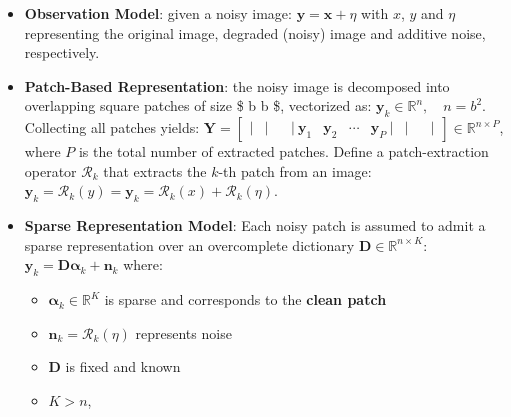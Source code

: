 \documentclass[11pt]{article}
\providecommand{\tightlist}{%
      \setlength{\itemsep}{0pt}\setlength{\parskip}{0pt}}
\begin{document}
\begin{itemize}
\tightlist
\item
  \textbf{Observation Model}: given a noisy image:
  \(\mathbf{y} = \mathbf{x} + \eta\) with \(x\), \(y\) and \(\eta\)
  representing the original image, degraded (noisy) image and additive
  noise, respectively.
\item
  \textbf{Patch-Based Representation}: the noisy image is decomposed
  into overlapping square patches of size \$ b \times b \$, vectorized
  as: \(\mathbf{y}_k \in \mathbb{R}^n, \quad n = b^2\). Collecting all
  patches yields:
  \(\mathbf{Y} = \begin{bmatrix} | & | & & | \ \mathbf{y}_1 & \mathbf{y}_2 & \cdots & \mathbf{y}_P \ | & | & & | \end{bmatrix} \in \mathbb{R}^{n \times P}\),
  where \(P\) is the total number of extracted patches. Define a
  patch-extraction operator \(\mathcal{R}_k\) that extracts the \(k\)-th
  patch from an image:
  \(\mathbf{y}_k = \mathcal{R}_k(y)=\mathbf{y}_k = \mathcal{R}_k(x) + \mathcal{R}_k(\eta)\).
\item
  \textbf{Sparse Representation Model}: Each noisy patch is assumed to
  admit a sparse representation over an overcomplete dictionary
  \(\mathbf{D} \in \mathbb{R}^{n \times K}\):
  \(\mathbf{y}_k = \mathbf{D}\boldsymbol{\alpha}_k + \mathbf{n}_k\)
  where:

  \begin{itemize}
  \tightlist
  \item
    \(\boldsymbol{\alpha}_k \in \mathbb{R}^K\) is sparse and corresponds
    to the \textbf{clean patch}
  \item
    \(\mathbf{n}_k = \mathcal{R}_k(\eta)\) represents noise
  \item
    \(\mathbf{D}\) is fixed and known
  \item
    \(K > n\),
  \end{itemize}


\end{itemize}
\end{document}
